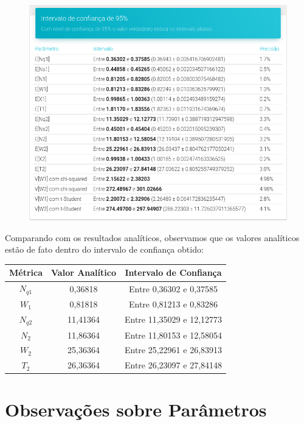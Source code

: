 \documentclass[a4paper,12pt]{report}
\begin{document}
\begin{figure}[H]
\includegraphics[width=1\textwidth]{./graficos/cap4/rho09.png}
\vspace{-10mm}
\end{figure}

Comparando com os resultados analíticos, observamos que os valores analíticos estão de fato dentro do intervalo de confiança obtido:

\vspace{-5mm}
\begin{center}
\begin{tabular}{ c c c }
  \hline
  \textbf{Métrica} & \textbf{Valor Analítico} & \textbf{Intervalo de Confiança} \\
  \hline
  $N_{q1}$ & 0,36818 & Entre 0,36302 e 0,37585 \\
  $W_1$    & 0,81818 & Entre 0,81213 e 0,83286 \\
  $N_{q2}$ & 11,41364 & Entre 11,35029 e 12,12773 \\
  $N_2$    & 11,86364 & Entre 11,80153 e 12,58054 \\
  $W_2$    & 25,36364 & Entre 25,22961 e 26,83913 \\
  $T_2$    & 26,36364 & Entre 26,23097 e 27,84148 \\
  \hline
\end{tabular}
\end{center}

\section{Observações sobre Parâmetros}
\end{document}
